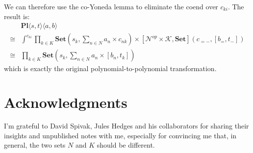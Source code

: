 \documentclass[11pt]{amsart}
\begin{document}
 
 We can therefore use the co-Yoneda lemma to eliminate the coend over $c_{ki}$. The result is:
 \begin{align*}
 &\mathbf{Pl}\langle s, t\rangle \langle a, b\rangle
 \\
\cong & \int^{c_{k i}} 
 \prod_{k \in K} \mathbf{Set} \left(s_k,  \sum_{n \in N} a_n \times c_{n k} \right) \times 
 [\mathcal{N}^{op} \times \mathcal{K}, \mathbf{Set}]\left(c_{= -}, [b_=, t_- ]\right) 
\\
\cong & \prod_{k \in K} \mathbf{Set}\left(s_k, \sum_{n \in N} a_n \times [b_n, t_k] \right)
 \end{align*}
which is exactly the original polynomial-to-polynomial transformation.

\section{Acknowledgments}
I'm grateful to David Spivak, Jules Hedges and his collaborators for sharing their insights and unpublished notes with me, especially for convincing me that, in general, the two sets $N$ and $K$ should be different.
        
\end{document}
